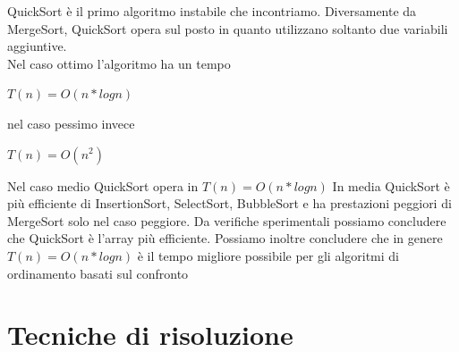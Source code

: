 \documentclass[11pt, oneside]{article}   	%
\begin{document}
\begin{itemize}
\begin{center}
\end{center}
QuickSort è il primo algoritmo instabile che incontriamo. Diversamente da MergeSort, QuickSort opera sul posto in quanto utilizzano soltanto due variabili aggiuntive. \\Nel caso ottimo l'algoritmo ha un tempo \begin{center} $T(n) = O(n * logn)$ \end{center}nel caso pessimo invece \begin{center} $T(n) = O(n^2)$ \end{center} Nel caso medio QuickSort opera in $T(n) = O(n * logn)$
In media QuickSort è più efficiente di InsertionSort, SelectSort, BubbleSort e ha prestazioni peggiori di MergeSort solo nel caso peggiore. Da verifiche sperimentali possiamo concludere che QuickSort è l'array più efficiente. Possiamo inoltre concludere che in genere $T(n) = O(n * logn)$ è il tempo migliore possibile per gli algoritmi di ordinamento basati sul confronto
\end{itemize}
\section{Tecniche di risoluzione}
\end{document}
